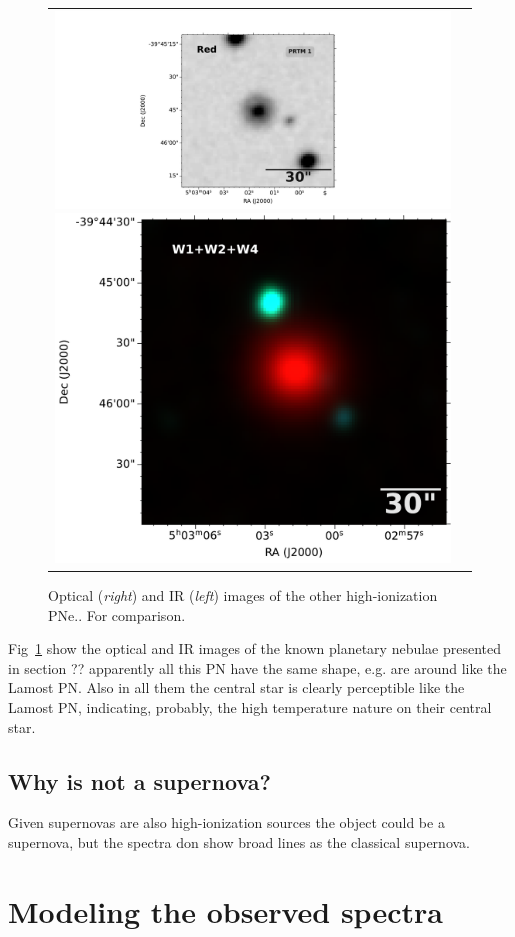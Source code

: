 \documentclass[fleqn,usenatbib]{mnras}
\begin{document}
{\begin{figure}
\begin{tabular}{l l}
\includegraphics[width=0.535\linewidth, trim=280 10 330 10, clip]{Figs/dss_search_red.pdf}
\includegraphics[width=0.47\linewidth, trim=58 0 0 0]{Figs/0754m394_ac51-w4-int-3_ra75.75721626934_dec-39.76236833917_asec150.000-421-RGB.pdf}\\

\end{tabular}  
  \caption{Optical (\textit{right}) and IR (\textit{left}) images of the other high-ionization PNe.. For comparison. } 
  \label{fig:images-known}
\end{figure}

Fig~\ref{fig:images-known} show the optical and IR images of the known planetary nebulae
presented in section ?? apparently all this PN have the same shape, e.g. are around like
the Lamost PN. Also in all them the central star is clearly perceptible like the Lamost PN,
indicating, probably, the high temperature nature on their central star.

\subsection{Why is not a supernova?}
\label{sec:snr}

Given supernovas are also high-ionization sources the object could be
a supernova, but the spectra don show broad lines as the classical supernova.

\section{Modeling the observed spectra}
\label{sec:model}

}
\end{document}
